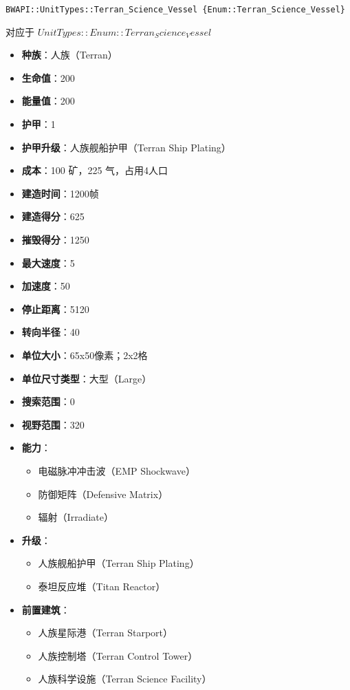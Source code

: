 \begin{tcolorbox}[colback=white, colframe=black!60!white, title=Terran\_Science\_Vessel(), arc=0mm]
    \begin{verbatim}
BWAPI::UnitTypes::Terran_Science_Vessel {Enum::Terran_Science_Vessel}
    \end{verbatim}
    对应于  $ UnitTypes::Enum::Terran_Science_Vessel $ 
    
    \begin{itemize}
        \item \textbf{种族}：人族（Terran）
        \item \textbf{生命值}：200
        \item \textbf{能量值}：200
        \item \textbf{护甲}：1
        \item \textbf{护甲升级}：人族舰船护甲（Terran Ship Plating）
        \item \textbf{成本}：100 矿，225 气，占用4人口
        \item \textbf{建造时间}：1200帧
        \item \textbf{建造得分}：625
        \item \textbf{摧毁得分}：1250
        \item \textbf{最大速度}：5
        \item \textbf{加速度}：50
        \item \textbf{停止距离}：5120
        \item \textbf{转向半径}：40
        \item \textbf{单位大小}：65x50像素；2x2格
        \item \textbf{单位尺寸类型}：大型（Large）
        \item \textbf{搜索范围}：0
        \item \textbf{视野范围}：320
        \item \textbf{能力}：
            \begin{itemize}
                \item 电磁脉冲冲击波（EMP Shockwave）
                \item 防御矩阵（Defensive Matrix）
                \item 辐射（Irradiate）
            \end{itemize}
        \item \textbf{升级}：
            \begin{itemize}
                \item 人族舰船护甲（Terran Ship Plating）
                \item 泰坦反应堆（Titan Reactor）
            \end{itemize}
        \item \textbf{前置建筑}：
            \begin{itemize}
                \item 人族星际港（Terran Starport）
                \item 人族控制塔（Terran Control Tower）
                \item 人族科学设施（Terran Science Facility）
            \end{itemize}
        \end{itemize}
\end{tcolorbox}
